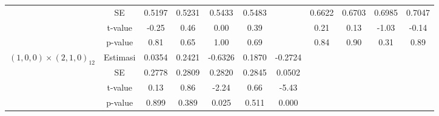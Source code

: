 \begin{enumerate}[label=\alph*.]
\begin{longtable}{|c|c|c|c|c|c|c|c|c|c|c|}
            & SE
            & {0.5197} & {0.5231}
            & {0.5433} & {0.5483} & {}
            & {0.6622} & {0.6703}
            & {0.6985} & {0.7047} \\ \cline{2-11}

            & t-value
            & {-0.25} & {0.46}
            & {0.00} & {0.39} & {}
            & {0.21} & {0.13}
            & {-1.03} & {-0.14} \\ \cline{2-11}

            & p-value
            & {0.81} & {0.65}
            & {1.00} & {0.69} & {}
            & {0.84} & {0.90}
            & {0.31} & {0.89} \\ \hline

            \multirow{4}{*}{$(1,0,0)\times(2,1,0)_{12}$}
            & Estimasi
            & {0.0354} & {0.2421}
            & {-0.6326} & {0.1870} & {-0.2724}
            & {} & {}
            & {} & {} \\ \cline{2-11}

            & SE
            & {0.2778} & {0.2809}
            & {0.2820} & {0.2845} & {0.0502}
            & {} & {}
            & {} & {} \\ \cline{2-11}

            & t-value
            & {0.13} & {0.86}
            & {-2.24} & {0.66} & {-5.43}
            & {} & {}
            & {} & {} \\ \cline{2-11}

            & p-value
            & {0.899} & {0.389}
            & {0.025} & {0.511} & {0.000}
            & {} & {}
            & {} & {} \\ \hline

        \end{longtable}
        \normalsize
\end{enumerate}